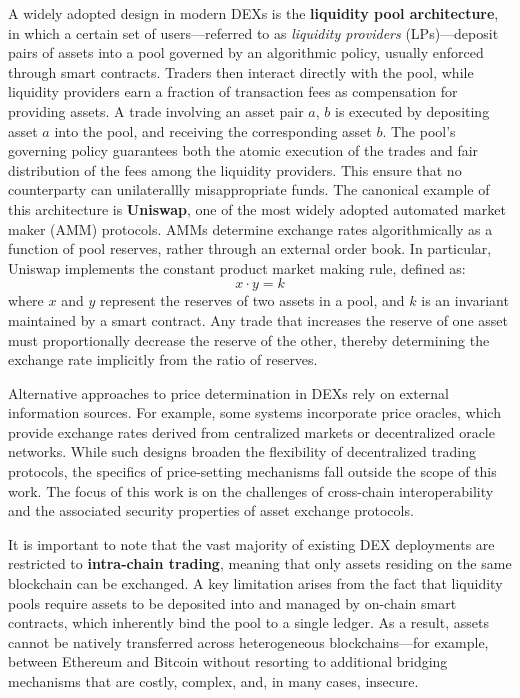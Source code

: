 A widely adopted design in modern DEXs is the \textbf{liquidity pool architecture}, in which a certain set of users—referred to as \textit{liquidity providers} (LPs)—deposit pairs of assets into a pool governed by an algorithmic policy, usually enforced through smart contracts. Traders then interact directly with the pool, while liquidity providers earn a fraction of transaction fees as compensation for providing assets.  A trade involving an asset pair $a$, $b$ is executed by depositing asset $a$ into the pool, and receiving the corresponding asset $b$. The pool's governing policy guarantees both the atomic execution of the trades and fair distribution of the fees among the liquidity providers. This ensure that no counterparty can unilaterallly misappropriate funds. 
The canonical example of this architecture is \textbf{Uniswap}, one of the most widely adopted automated market maker (AMM) protocols. AMMs determine exchange rates algorithmically as a function of pool reserves, rather through an external order book. In particular, Uniswap implements the constant product market making rule, defined as:
\[
x \cdot y = k
\]
where $x$ and $y$ represent the reserves of two assets in a pool, and $k$ is an invariant maintained by a smart contract. Any trade that increases the reserve of one asset must proportionally decrease the reserve of the other, thereby determining the exchange rate implicitly from the ratio of reserves.

Alternative approaches to price determination in DEXs rely on external information sources. For example, some systems incorporate price oracles, which provide exchange rates derived from centralized markets or decentralized oracle networks. While such designs broaden the flexibility of decentralized trading protocols, the specifics of price-setting mechanisms fall outside the scope of this work. The focus of this work is on the challenges of cross-chain interoperability and the associated security properties of asset exchange protocols.

It is important to note that the vast majority of existing DEX deployments are restricted to \textbf{intra-chain trading}, meaning that only assets residing on the same blockchain can be exchanged. A key limitation arises from the fact that liquidity pools require assets to be deposited into and managed by on-chain smart contracts, which inherently bind the pool to a single ledger. As a result, assets cannot be natively transferred across heterogeneous blockchains—for example, between Ethereum and Bitcoin without resorting to additional bridging mechanisms that are costly, complex, and, in many cases, insecure.

